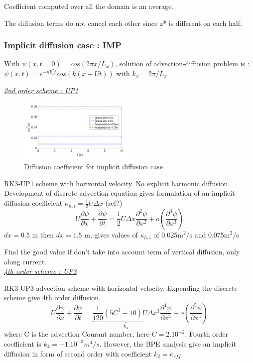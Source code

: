 Coefficient computed over all the domain is an average.

The diffusion terms do not cancel each other since z* is different on each half.

\subsubsection{Implicit diffusion case : IMP}

With $\psi(x,t=0)=cos(2\pi x/L_x)$, solution of advection-diffusion problem is : $\psi(x,t)=e^{-\kappa k_x^2 t}cos(k(x-Ut))$ with $k_x=2\pi/L_x$


\underline{\textit{2nd order scheme : UP1}}
\begin{figure}[h!]
\centering
\includegraphics[width=0.5\textwidth]{./CHAP_BPE/AGBPE_numlab3.png}
\caption{Diffusion coefficient for implicit diffusion case}
\label{fig3numlab}
\end{figure}

RK3-UP1 scheme with horizontal velocity. No explicit harmonic diffusion. Development of discrete advection equation gives formulation of an implicit diffusion coefficient $\kappa_{h,i}=\frac{1}{2}U \Delta x$ (ref?)
\begin{equation}
U \frac{\partial \psi}{\partial x} +\frac{\partial \psi}{\partial t} = \frac{1}{2} U \Delta x  \frac{\partial^2 \psi}{\partial x^2} + o(\frac{\partial^3 \psi}{\partial x^3})
\end{equation}
$dx=0.5$ m then $dx=1.5$ m, gives values of $\kappa_{h,i}$ of 0.025m$^2$/s and 0.075m$^2$/s

Find the good value if don't take into account term of vertical diffusion, only along current.\\

\underline{\textit{4th order scheme : UP3}}

RK3-UP3 advection scheme with horizontal velocity. Expending the discrete scheme give 4th order diffusion.
\begin{equation}
U \frac{\partial \psi}{\partial x} +\frac{\partial \psi}{\partial t} = \underbrace{\frac{1}{120}(5 C^3-10) U \Delta x^3}_{k_4}  \frac{\partial^4 \psi}{\partial x^4} + o(\frac{\partial^5 \psi}{\partial x^5})
\end{equation}
where C is the advection Courant number, here $C=2 . 10^{-2}$. Fourth order coefficient is $k_4=-1.10^{-3} m^4/s$. However, the BPE analysis give an implicit diffusion in form of second order with coefficient $k_2=\kappa_{eff}$.

